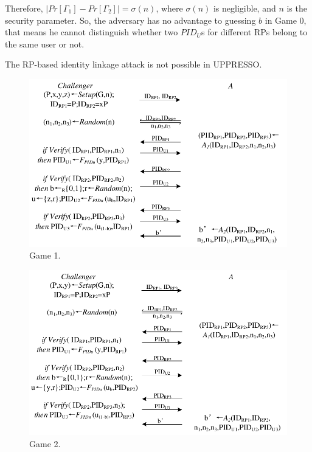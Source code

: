 Therefore, $|Pr[\Gamma_1]-Pr[\Gamma_2]|=\sigma(n)$, where $\sigma(n)$ is negligible, and $n$ is the security parameter. So, the adversary has no advantage to guessing $b$ in Game 0, that means he cannot distinguish whether two $PID_U$s for different RPs belong to the same user or not. 

The RP-based identity linkage attack is not possible in UPPRESSO.


\begin{figure}[t]
  \centering
  \includegraphics[width=1\linewidth]{fig/game1.pdf}
  \caption{Game 1.}
  \label{fig:game1}
\end{figure}




\begin{figure}[t]
  \centering
  \includegraphics[width=1\linewidth]{fig/game2.pdf}
  \caption{Game 2.}
  \label{fig:game2}
\end{figure}

